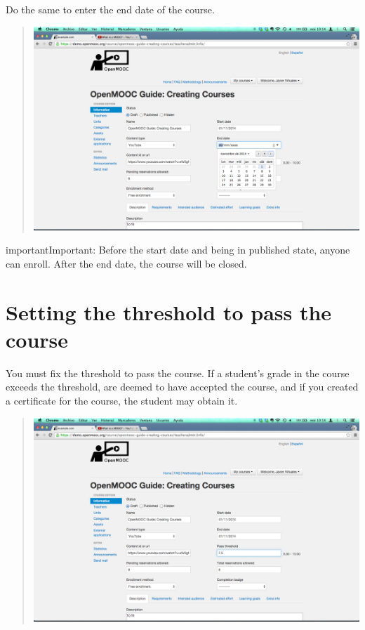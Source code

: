 \documentclass[letterpaper,10pt,english]{sphinxmanual}
\begin{document}
Do the same to enter the end date of the course.
\begin{quote}

\includegraphics{2_course_information-4.png}
\end{quote}

\begin{notice}{important}{Important:}
Before the start date and being in published state, anyone can enroll.
After the end date, the course will be closed.
\end{notice}


\section{Setting the threshold to pass the course}
\label{course_page:setting-the-threshold-to-pass-the-course}
You must fix the threshold to pass the course. If a student's grade in the course exceeds the threshold, are
deemed to have accepted the course, and if you created a certificate for the course, the student may obtain it.
\begin{quote}

\includegraphics{2_course_information-5.png}
\end{quote}
\end{document}
